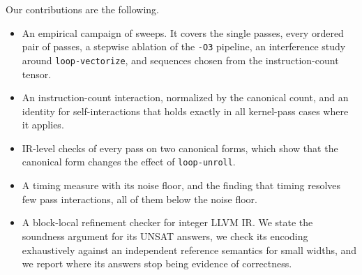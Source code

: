Our contributions are the following.
\begin{itemize}
  \item An empirical campaign of \NumSweeps{} sweeps. It covers the single passes, every ordered pair of \NumThreePasses{} passes,
        a stepwise ablation of the \texttt{-O3} pipeline, an interference study around \texttt{loop-vectorize}, and sequences chosen
        from the instruction-count tensor.
  \item An instruction-count interaction, normalized by the canonical count, and an identity for self-interactions that holds
        exactly in all \InstSelfIdentityCases{} kernel-pass cases where it applies.
  \item IR-level checks of every pass on two canonical forms, which show that the canonical form changes the effect of
        \texttt{loop-unroll}.
  \item A timing measure with its noise floor, and the finding that timing resolves few pass interactions, all of them below the noise floor.
  \item A block-local refinement checker for integer LLVM IR. We state the soundness argument for its UNSAT answers, we check its
        encoding exhaustively against an independent reference semantics for small widths, and we report where its answers stop
        being evidence of correctness.
\end{itemize}

